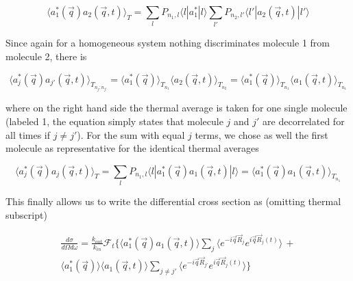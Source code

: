 \documentclass[11pt,a4paper]{article}
\begin{document}
\begin{equation}
\langle a_{1}^{*} (\vec q) a_2 (\vec q, t) \rangle_T =
\sum_l P_{n_1, l}  \langle l | a_{1}^{*}|l \rangle
\sum_{l'} P_{n_2, l'}  \langle  l' | a_2 (\vec q, t) |l' \rangle
\end{equation}

Since again for a homogeneous system nothing discriminates molecule 1 from molecule 2, there is

\begin{equation}
\langle a_{j}^{*} (\vec q) a_{j'} (\vec q, t) \rangle_{T_{n_j;n_{j'} } }=
\langle a_{1}^{*} (\vec q)  \rangle_{T_{n_1}}
\langle a_{2} (\vec q, t) \rangle_{T_{n_2}}
=
\langle a_{1}^{*} (\vec q)  \rangle_{T_{n_1}} \langle a_{1} (\vec q, t) \rangle_{T_{n_1}}
\end{equation}


where on the right hand side the thermal average is taken for one single molecule (labeled 1, the equation simply
states that molecule $j$ and $j'$ are decorrelated for all times if $j \ne j'$). \newline
For the sum with equal $j$ terms, we chose as well the first molecule as representative for the identical
thermal averages

\begin{equation}
\langle a_{j}^{*} (\vec q) a_{j} (\vec q, t) \rangle_T =
\sum_l P_{n_1, l}  \langle l | a_{1}^{*} (\vec q) a_1 (\vec q, t) |l \rangle =
\langle a_{1}^{*} (\vec q) a_1 (\vec q, t)\rangle_{T_{n_1}}
\end{equation}

This finally allows us to write the differential cross section as (omitting thermal subscript)

\begin{equation}
\begin{split}
\frac{d \sigma}{ d \Omega d \omega} =
\frac{k_{out}}{k_{in}}
\mathcal{F}_t
\biggl\{
\langle a_{1}^{*} (\vec q) a_1 (\vec q, t)\rangle
\sum_{j} \langle e^{-i \vec q \vec R_{j}} e^{i \vec q \vec R_j (t)} \rangle
\, +
\\
\langle a_{1}^{*} (\vec q)  \rangle \langle a_{1} (\vec q, t) \rangle
\sum_{j \ne j' }\langle e^{-i \vec q \vec R_{j'}} e^{i \vec q \vec R_j (t)} \rangle
\biggr\}
\end{split}
\end{equation}
\end{document}
